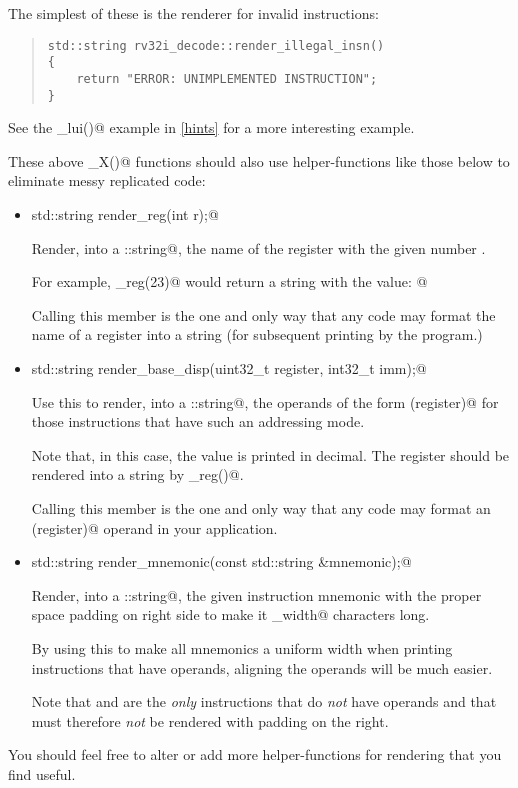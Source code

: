 \documentclass[11pt]{article}
\begin{document}
\begin{itemize}
The simplest of these is the renderer for invalid instructions:

{\small
\begin{quote}
\begin{verbatim}
std::string rv32i_decode::render_illegal_insn()
{
    return "ERROR: UNIMPLEMENTED INSTRUCTION";
}
\end{verbatim}
\end{quote}
}

See the \verb@render_lui()@ example in \autoref{hints} for a more interesting example.

These above \verb@render_X()@ functions should also use helper-functions like 
those below to eliminate messy replicated code:

\begin{itemize}
\item \verb@static std::string render_reg(int r);@

Render, into a \verb@std::string@, the name of the register with the given 
number \verb@r@.

For example, \verb@render_reg(23)@ would return a string with the value:
@

Calling this member is the one and only way that any code may format the name of 
a register into a string (for subsequent printing by the program.)

\item \verb@static std::string render_base_disp(uint32_t register, int32_t imm);@

Use this to render, into a \verb@std::string@, the operands of the 
form \verb@imm(register)@ for those instructions that have such
an addressing mode.

Note that, in this case, the \verb@imm@ value is printed in decimal.
The register should be rendered into a string by \verb@render_reg()@.

Calling this member is the one and only way that any code may format 
an \verb@imm(register)@ operand in your application.


\item \verb@static std::string render_mnemonic(const std::string &mnemonic);@

Render, into a \verb@std::string@, the given instruction mnemonic with the proper
space padding on right side to make it \verb@mnemonic_width@ characters long.

By using this to make all mnemonics a uniform width when printing instructions
that have operands, aligning the operands will be much easier.

Note that \verb@ecall@ and \verb@ebreak@ are the {\em only} instructions that 
do {\em not} have operands and that must therefore {\em not} be rendered with
padding on the right.

\end{itemize}


You should feel free to alter or add more helper-functions for rendering that you find useful.


\end{itemize}
\end{document}
